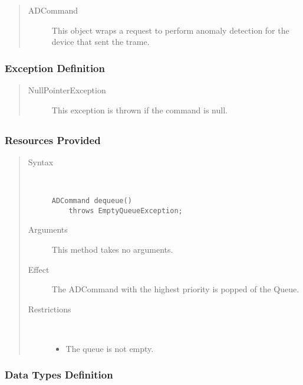 \begin{quote}
	\begin{description}
		\item[ADCommand] This object wraps a request to perform anomaly detection for
		the device that sent the trame.	
	\end{description} 
\end{quote}

\subsubsection{Exception Definition}

\begin{quote}
	\begin{description}
		\item[NullPointerException] This exception is thrown if the command is null.
	\end{description} 
\end{quote}

\subsection{}

\subsubsection{Resources Provided}

\begin{quote}
	\begin{description}
		\item[Syntax] \ 
		\begin{verbatim}
ADCommand dequeue() 
    throws EmptyQueueException;
		\end{verbatim}
		\item[Arguments] This method takes no arguments.
		\item[Effect] The ADCommand with the highest priority is popped of the
		Queue.
		\item[Restrictions] \ 
		\begin{itemize}
			\item The queue is not empty. 
		\end{itemize}
	\end{description} 
\end{quote}

\subsubsection{Data Types Definition}

